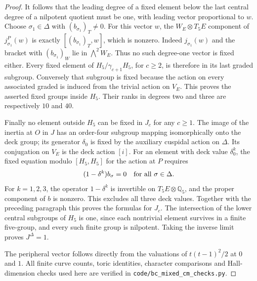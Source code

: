\begin{proof}
It follows that the leading degree of a fixed element below
the last central degree of a nilpotent quotient must be one,
with leading vector proportional to $w$.
Choose $\sigma_1\in\Delta$ with $(b_{\sigma_1})_T\ne0$.
For this vector $w$, the $W_E\otimes T_5E$ component of
$j_{\sigma_1}^P(w)$ is exactly
$[(b_{\sigma_1})_T,w]$, which is nonzero.
Indeed $j_{\sigma_1}(w)$ and the bracket with
$(b_{\sigma_1})_W$ lie in $\bigwedge^2W_E$.
Thus no such degree-one vector is fixed either.
Every fixed element of $H_5/\gamma_{c+1}H_5$, for $c\ge2$,
is therefore in its last graded subgroup.
Conversely that subgroup is fixed because the action on
every associated graded is induced from the trivial action
on $V_E$. This proves the asserted fixed groups inside
$H_5$. Their ranks in degrees two and three are respectively
$10$ and $40$.

Finally no element outside $H_5$ can be fixed in $J_c$
for any $c\ge1$. The image of the inertia at $O$ in $J$
has an order-four subgroup mapping isomorphically onto the
deck group; its generator $\delta_0$ is fixed by the
auxiliary cuspidal action on $\Delta$.
Its conjugation on $V_E$ is the deck action $[i]$.
For an element with deck value $\delta_0^k$, the fixed
equation modulo $[H_5,H_5]$ for the action at $P$ requires
\[
                    (1-\delta^k)b_\sigma=0
                            \quad\hbox{for all }\sigma\in\Delta.
\]
For $k=1,2,3$, the operator $1-\delta^k$ is invertible
on $T_5E\otimes\mathbb Q_5$, and the proper component
of $b$ is nonzero. This excludes all three deck values.
Together with the preceding paragraph this proves the
formulas for $J_c$.
The intersection of the lower central subgroups of $H_5$
is one, since each nontrivial element survives in a finite
five-group, and every such finite group is nilpotent.
Taking the inverse limit proves $J^\Delta=1$.

The peripheral vector follows directly from the valuations
of $t(t-1)^2/2$ at $0$ and $1$.
All finite curve counts, toric identities, character
comparisons and Hall-dimension checks used here are
verified in \texttt{code/bc\_mixed\_cm\_checks.py}.
\end{proof}

